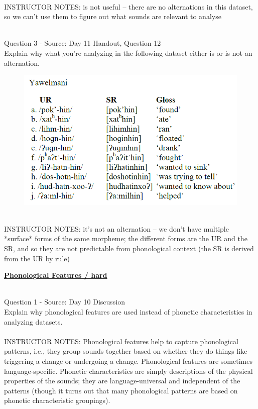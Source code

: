 \documentclass[12pt]{article}
\begin{document}
~\\
INSTRUCTOR NOTES: is not useful -- there are no alternations in this dataset, so we can't use them to figure out what sounds are relevant to analyse


~\\

{\large Question 3} - Source: Day 11 Handout, Question 12\\

Explain why what you’re analyzing in the following dataset either is or is not an alternation.\\

\begin{figure}[H]
\includegraphics{../images/yawelmani.png}
\end{figure}

~\\
INSTRUCTOR NOTES: it's not an alternation -- we don't have multiple *surface* forms of the same morpheme; the different forms are the UR and the SR, and so they are not predictable from phonological context (the SR is derived from the UR by rule)


\newpage\textbf{\underline{\huge Phonological Features / hard\\}}

~\\

{\large Question 1} - Source: Day 10 Discussion\\

Explain why phonological features are used instead of phonetic characteristics in analyzing datasets.\\


~\\
INSTRUCTOR NOTES: Phonological features help to capture phonological patterns, i.e., they group sounds together based on whether they do things like triggering a change or undergoing a change. Phonological features are sometimes language-specific. Phonetic characteristics are simply descriptions of the physical properties of the sounds; they are language-universal and independent of the patterns (though it turns out that many phonological patterns are based on phonetic characteristic groupings).
\end{document}

